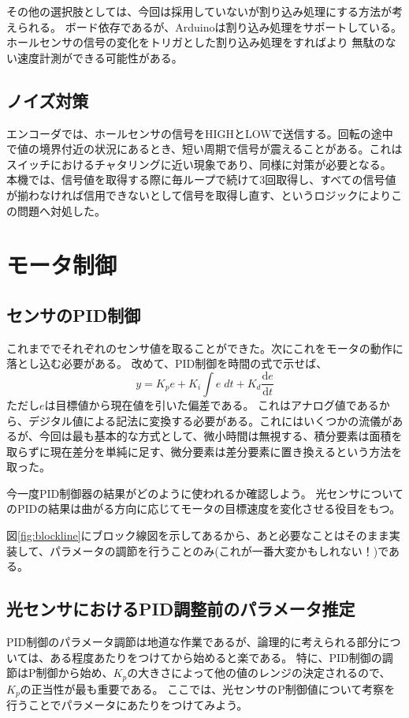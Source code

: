 \documentclass{ltjsreport}
\begin{document}
その他の選択肢としては、今回は採用していないが割り込み処理にする方法が考えられる。
ボード依存であるが、Arduinoは割り込み処理をサポートしている。ホールセンサの信号の変化をトリガとした割り込み処理をすればより
無駄のない速度計測ができる可能性がある。
\subsection{ノイズ対策}
エンコーダでは、ホールセンサの信号をHIGHとLOWで送信する。回転の途中で値の境界付近の状況にあるとき、短い周期で信号が震えることがある。これはスイッチにおけるチャタリングに近い現象であり、同様に対策が必要となる。
本機では、信号値を取得する際に毎ループで続けて3回取得し、すべての信号値が揃わなければ信用できないとして信号を取得し直す、というロジックによりこの問題へ対処した。



\section{モータ制御}


\subsection{センサのPID制御}\label{sec:SensorIntegration}
これまででそれぞれのセンサ値を取ることができた。次にこれをモータの動作に落とし込む必要がある。
改めて、PID制御を時間の式で示せば、
\[
  y = K_p e + K_i \int e \; dt + K_d  \frac{\mathrm{d}e}{\mathrm{d}t}
\]
ただし$e$は目標値から現在値を引いた偏差である。
これはアナログ値であるから、デジタル値による記法に変換する必要がある。これにはいくつかの流儀があるが、今回は最も基本的な方式として、微小時間は無視する、積分要素は面積を取らずに現在差分を単純に足す、微分要素は差分要素に置き換えるという方法を取った。

今一度PID制御器の結果がどのように使われるか確認しよう。
光センサについてのPIDの結果は曲がる方向に応じてモータの目標速度を変化させる役目をもつ。

図\ref{fig:blockline}にブロック線図を示してあるから、あと必要なことはそのまま実装して、パラメータの調節を行うことのみ(これが一番大変かもしれない！)である。

\subsection{光センサにおけるPID調整前のパラメータ推定}\label{sec:PIDestimate}
PID制御のパラメータ調節は地道な作業であるが、論理的に考えられる部分については、ある程度あたりをつけてから始めると楽である。
特に、PID制御の調節はP制御から始め、$K_p$の大きさによって他の値のレンジの決定されるので、$K_p$の正当性が最も重要である。
ここでは、光センサのP制御値について考察を行うことでパラメータにあたりをつけてみよう。
\end{document}
